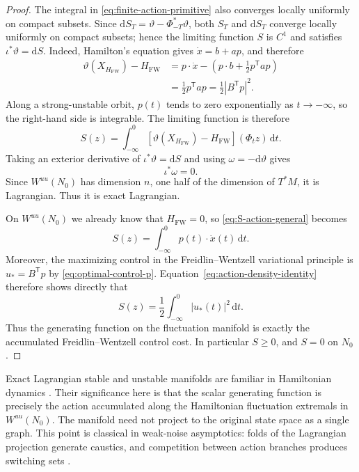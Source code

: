 \documentclass[11pt]{article}
\theoremstyle{definition}
\theoremstyle{remark}
\newcommand{\Hs}{H_{\mathrm{FW}}}
\newcommand{\dd}{\mathrm{d}}
\newcommand{\cT}{\mathsf{T}}
\begin{document}
\begin{proof}
The integral in \eqref{eq:finite-action-primitive} also converges locally uniformly on compact subsets.  Since $\dd S_T=\vartheta-\Phi_{-T}^*\vartheta$, both $S_T$ and $\dd S_T$ converge locally uniformly on compact subsets; hence the limiting function $S$ is $C^1$ and satisfies $\iota^*\vartheta=\dd S$.  Indeed, Hamilton's equation gives $\dot x=b+ap$, and therefore
\begin{align}
\vartheta(X_{\Hs})-\Hs
&=
p\cdot\dot x
-
\left(p\cdot b+\frac12p^{\cT}ap\right)\\
&=
\frac12p^{\cT}ap
=
\frac12|B^{\cT}p|^2.
\label{eq:action-density-identity}
\end{align}
Along a strong-unstable orbit, $p(t)$ tends to zero exponentially as $t\to-\infty$, so the right-hand side is integrable.  The limiting function is therefore
\begin{equation}
S(z)
=
\int_{-\infty}^{0}
\left[\vartheta(X_{\Hs})-\Hs\right](\Phi_tz)\,\dd t.
\label{eq:S-action-general}
\end{equation}
Taking an exterior derivative of $\iota^*\vartheta=\dd S$ and using $\omega=-\dd\vartheta$ gives
\[
\iota^*\omega=0.
\]
Since $W^{uu}(N_0)$ has dimension $n$, one half of the dimension of $T^*M$, it is Lagrangian.  Thus it is exact Lagrangian.

On $W^{uu}(N_0)$ we already know that $\Hs=0$, so \eqref{eq:S-action-general} becomes
\begin{equation}
S(z)=\int_{-\infty}^{0}p(t)\cdot\dot x(t)\,\dd t.
\label{eq:S-action}
\end{equation}
Moreover, the maximizing control in the Freidlin--Wentzell variational principle is $u_*=B^{\cT}p$ by \eqref{eq:optimal-control-p}.  Equation~\eqref{eq:action-density-identity} therefore shows directly that
\begin{equation}
S(z)
=
\frac12\int_{-\infty}^{0}|u_*(t)|^2\,\dd t.
\label{eq:S-control-action}
\end{equation}
Thus the generating function on the fluctuation manifold is exactly the accumulated Freidlin--Wentzell control cost.  In particular $S\ge0$, and $S=0$ on $N_0$.
\end{proof}

Exact Lagrangian stable and unstable manifolds are familiar in Hamiltonian dynamics \cite{RudnevWiggins1999}.  Their significance here is that the scalar generating function is precisely the action accumulated along the Hamiltonian fluctuation extremals in $W^{uu}(N_0)$.  The manifold need not project to the original state space as a single graph.  This point is classical in weak-noise asymptotics: folds of the Lagrangian projection generate caustics, and competition between action branches produces switching sets \cite{GrahamTel1985,MaierStein1993PRL,MaierStein1996,SmelyanskiyDykmanMaier1997}.
\end{document}

